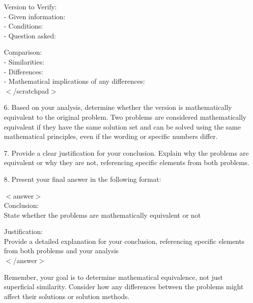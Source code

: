 \begin{tcolorbox}
Version to Verify: \\
- Given information: \\
- Conditions: \\
- Question asked:

Comparison: \\
- Similarities: \\
- Differences: \\
- Mathematical implications of any differences: \\
$<$/scratchpad$>$

6. Based on your analysis, determine whether the version is mathematically equivalent to the original problem. Two problems are considered mathematically equivalent if they have the same solution set and can be solved using the same mathematical principles, even if the wording or specific numbers differ.

7. Provide a clear justification for your conclusion. Explain why the problems are equivalent or why they are not, referencing specific elements from both problems.

8. Present your final answer in the following format:

$<$answer$>$\\
Conclusion:\\
State whether the problems are mathematically equivalent or not

Justification:\\
Provide a detailed explanation for your conclusion, referencing specific elements from both problems and your analysis\\
$<$/answer$>$

Remember, your goal is to determine mathematical equivalence, not just superficial similarity. Consider how any differences between the problems might affect their solutions or solution methods.
\end{tcolorbox}
